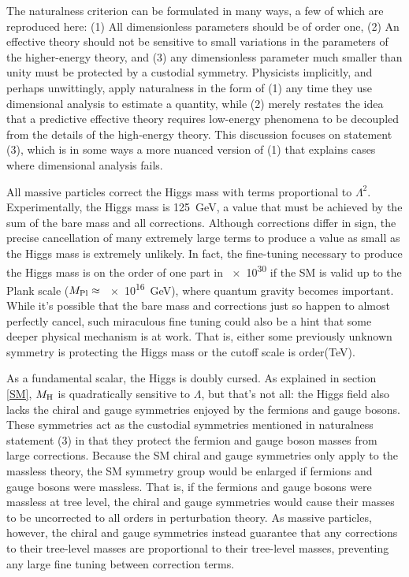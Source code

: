 \documentclass[12pt]{article}
\begin{document}
    The naturalness criterion can be formulated in many ways, a few of which are reproduced here: (1) All dimensionless parameters should be of order one, (2) An effective theory should not be sensitive to small variations in the parameters of the higher-energy theory, and (3) any dimensionless parameter much smaller than unity must be protected by a custodial symmetry. Physicists implicitly, and perhaps unwittingly, apply naturalness in the form of (1) any time they use dimensional analysis to estimate a quantity, while (2) merely restates the idea that a predictive effective theory requires low-energy phenomena to be decoupled from the details of the high-energy theory. This discussion focuses on statement (3), which is in some ways a more nuanced version of (1) that explains cases where dimensional analysis fails.

    All massive particles correct the Higgs mass with terms proportional to $\Lambda^2$. Experimentally, the Higgs mass is \SI{125}{\giga\electronvolt}, a value that must be achieved by the sum of the bare mass and all corrections. Although corrections differ in sign, the precise cancellation of many extremely large terms to produce a value as small as the Higgs mass is extremely unlikely. In fact, the fine-tuning necessary to produce the Higgs mass is on the order of one part in \num{e30} if the SM is valid up to the Plank scale ($M_{\mathrm{Pl}}\approx$ \SI{e16}{\giga\electronvolt}), where quantum gravity becomes important. While it's possible that the bare mass and corrections just so happen to almost perfectly cancel, such miraculous fine tuning could also be a hint that some deeper physical mechanism is at work. That is, either some previously unknown symmetry is protecting the Higgs mass or the cutoff scale is order(TeV).
    
    As a fundamental scalar, the Higgs is doubly cursed. As explained in section \ref{SM}, $M_{\mathrm{H}}$ is quadratically sensitive to $\Lambda$, but that's not all: the Higgs field also lacks the chiral and gauge symmetries enjoyed by the fermions and gauge bosons. These symmetries act as the custodial symmetries mentioned in naturalness statement (3) in that they protect the fermion and gauge boson masses from large corrections. Because the SM chiral and gauge symmetries only apply to the massless theory, the SM symmetry group would be enlarged if fermions and gauge bosons were massless. That is, if the fermions and gauge bosons were massless at tree level, the chiral and gauge symmetries would cause their masses to be uncorrected to all orders in perturbation theory. As massive particles, however, the chiral and gauge symmetries instead guarantee that any corrections to their tree-level masses are proportional to their tree-level masses, preventing any large fine tuning between correction terms.  
\end{document}
